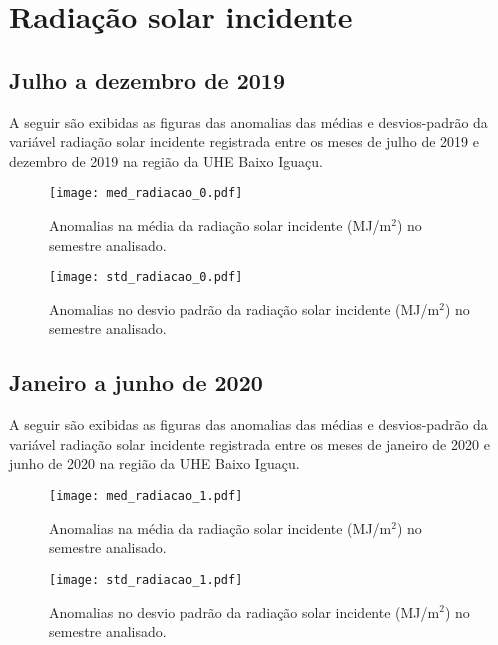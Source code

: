 \documentclass[a4paper,12pt]{article}
\begin{document}
        \newpage

        \section{Radiação solar incidente }
        \subsection{Julho a dezembro de 2019}
        \hspace{0.5cm} A seguir são exibidas as figuras das anomalias das médias e desvios-padrão da variável radiação solar incidente
        registrada entre os meses de julho de 2019 e dezembro de 2019 na região da UHE Baixo Iguaçu.

        \begin{figure}[!htb]
        \centering
        \texttt{[image: med\_radiacao\_0.pdf]}
        \caption{Anomalias na média da radiação solar incidente (MJ/m$^2$) no semestre analisado.}
        \label{fig:figmed_radiacao_0}
        \end{figure}

        \begin{figure}[!htb]
        \centering
        \texttt{[image: std\_radiacao\_0.pdf]}
        \caption{Anomalias no desvio padrão da radiação solar incidente (MJ/m$^2$) no semestre analisado.}
        \label{fig:figstd_radiacao_0}
        \end{figure}

        \newpage
        \subsection{Janeiro a junho de 2020}
        \hspace{0.5cm} A seguir são exibidas as figuras das anomalias das médias e desvios-padrão da variável radiação solar incidente
        registrada entre os meses de janeiro de 2020 e junho de 2020 na região da UHE Baixo Iguaçu.

        \begin{figure}[!htb]
        \centering
        \texttt{[image: med\_radiacao\_1.pdf]}
        \caption{Anomalias na média da radiação solar incidente (MJ/m$^2$) no semestre analisado.}
        \label{fig:figmed_radiacao_1}
        \end{figure}

        \begin{figure}[!htb]
        \centering
        \texttt{[image: std\_radiacao\_1.pdf]}
        \caption{Anomalias no desvio padrão da radiação solar incidente (MJ/m$^2$) no semestre analisado.}
        \label{fig:figstd_radiacao_1}
        \end{figure}
\end{document}
